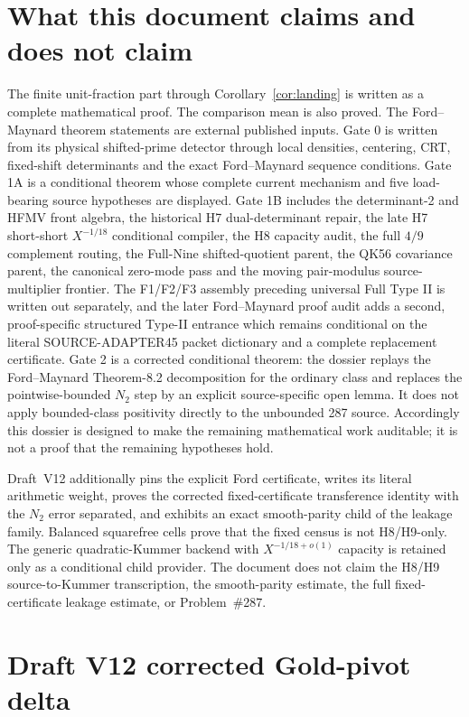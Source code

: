\documentclass[11pt]{article}
\theoremstyle{definition}
\theoremstyle{remark}
\newcommand{\1}{\mathbf 1}
\begin{document}
\section{What this document claims and does not claim}

The finite unit-fraction part through Corollary~\ref{cor:landing} is written as a complete mathematical proof.
The comparison mean is also proved.  The Ford--Maynard theorem statements are external published inputs.
Gate 0 is written from its physical shifted-prime detector through local densities, centering, CRT, fixed-shift
determinants and the exact Ford--Maynard sequence conditions.  Gate 1A is a conditional theorem whose complete
current mechanism and five load-bearing source hypotheses are displayed.  Gate 1B includes the determinant-2 and HFMV front algebra, the historical H7 dual-determinant repair, the late
H7 short-short $X^{-1/18}$ conditional compiler, the H8 capacity audit, the full $4/9$ complement routing, the
Full-Nine shifted-quotient parent, the QK56 covariance parent, the canonical zero-mode pass and the moving
pair-modulus source-multiplier frontier.  The F1/F2/F3 assembly preceding universal Full Type II is written out
separately, and the later Ford--Maynard proof audit adds a second, proof-specific structured Type-II entrance
which remains conditional on the literal SOURCE-ADAPTER45 packet dictionary and a complete replacement certificate.  Gate 2 is a corrected conditional theorem: the dossier replays the Ford--Maynard Theorem-8.2 decomposition
for the ordinary class and replaces the pointwise-bounded $N_2$ step by an explicit source-specific open lemma.
It does not apply bounded-class positivity directly to the unbounded 287 source.
Accordingly this dossier is designed to make the remaining mathematical work auditable; it is not a proof that
the remaining hypotheses hold.

Draft~V12 additionally pins the explicit Ford certificate, writes its literal arithmetic weight,
proves the corrected fixed-certificate transference identity with the $N_2$ error separated, and exhibits an
exact smooth-parity child of the leakage family.  Balanced squarefree cells prove that the fixed census is not
H8/H9-only.  The generic quadratic-Kummer backend with $X^{-1/18+o(1)}$ capacity is retained only as a
conditional child provider.  The document does not claim the H8/H9 source-to-Kummer transcription, the
smooth-parity estimate, the full fixed-certificate leakage estimate, or Problem~\#287.

\section{Draft V12 corrected Gold-pivot delta}
\end{document}
